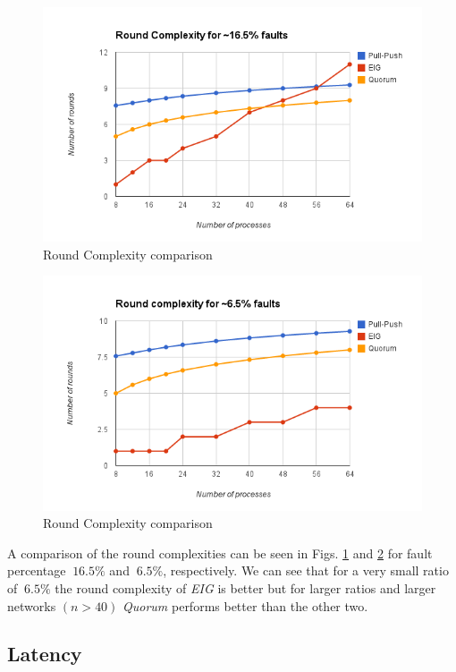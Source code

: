 \begin{figure}[ht]
 \centering
\includegraphics[scale=0.4]{Round16}
\caption{Round Complexity comparison}
 \label{fig:round16}
\end{figure}

\begin{figure}[ht]
 \centering
\includegraphics[scale=0.4]{Round6}
\caption{Round Complexity comparison}
 \label{fig:round6}
\end{figure}

A comparison of the round complexities can be seen in Figs. \ref{fig:round16} and \ref{fig:round6} for fault percentage $~16.5\%$ and $~6.5\%$, respectively. We can see that for a very small ratio of $~6.5\%$ the round complexity of \textit{EIG} is better but for larger ratios and larger networks $(n > 40)$ \textit{Quorum} performs better than the other two. 


\subsection{Latency}

